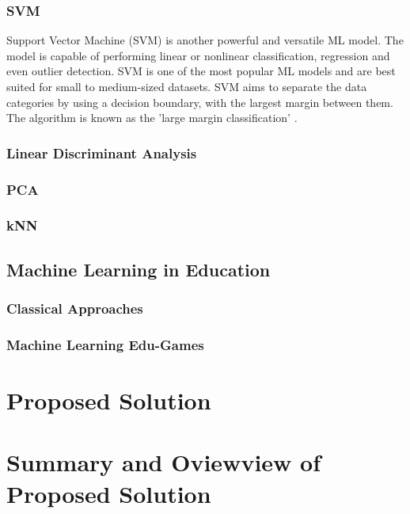 	\subsubsection{SVM}
	Support Vector Machine (SVM) is another powerful and versatile ML model. The model is capable of performing linear or nonlinear classification, regression and even outlier detection. SVM is one of the most popular ML models and are best suited for small to medium-sized datasets. SVM aims to separate the data categories by using a decision boundary, with the largest margin between them. The algorithm is known as the 'large margin classification' \cite{geron2019hands}.
	
	\subsubsection{Linear Discriminant Analysis}
	
	\subsubsection{PCA}
	
	\subsubsection{kNN}
	
	
	\subsection{Machine Learning in Education}
	
	\subsubsection{Classical Approaches}
	
	
	\subsubsection{Machine Learning Edu-Games}
	
	\section{Proposed Solution}
	
	\section{Summary and Oviewview of Proposed Solution}
	